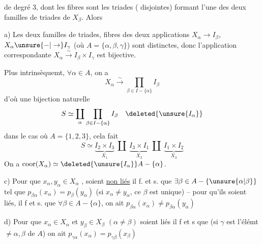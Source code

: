  de degré $3$, dont les  fibres sont les  triades ( disjointes) formant l'une des deux familles de triades de $X_\beta$. Alors

a) Les  deux familles de triades, fibres des deux applications $X_\alpha\to I_\beta$, $X_\alpha\unsure{-|\to}I_\gamma$ (où \deleted{\unsure{$\alpha$}} $A=\{\alpha,\beta,\gamma\}$) sont distinctes, donc l'application correspondante $X_\alpha\xrightarrow{\sim}I_\beta\times I_\gamma$ est bijective.

Plus intrinsèquemt, $\forall\alpha\in A$, on a
\[
 X_\alpha\xrightarrow{\sim}\prod_{\beta\in I-\{\alpha\}} I_\beta
\]
d'où une bijection naturelle
\[
 S\simeq\coprod_\alpha\prod_{\beta\in I-\{\alpha\}}I_\beta\quad\deleted{\unsure{I_{\alpha}}}
\]
dans le cas où $A=\{1,2,3\}$, cela fait
\[
 S\simeq\underbrace{I_2\times I_3}_{X_1}\ \amalg\
 \underbrace{I_3\times I_1}_{X_2}\ \amalg\
 \underbrace{I_1\times I_2}_{X_3}
\]
On a $\mathrm{coor}(X_\alpha)\simeq\deleted{\unsure{I_\alpha}}A-\{\alpha\}$.

c) Pour que  $x_\alpha,y_\alpha\in X_\alpha$ , soient \uline{non liés} il f. et s. que $\exists\beta\in A-\{\unsure{\alpha|\beta}\}$  tel que $p_{\beta\alpha}(x_\alpha)=p_\beta(y_\alpha)$ (si $x_\alpha\ne y_\alpha$, ce $\beta$ est unique) -- pour qu'ils soient liés, il f et s. que $\forall\beta\in A-\{\alpha\}$, on ait $p_{\beta\alpha}(x_\alpha)\ne p_{\beta\alpha}(y_\alpha)$

d) Pour que $x_\alpha\in X_\alpha$ et $y_\beta\in X_\beta$ $(\alpha\ne\beta)$ soient liés il f et s que (si $\gamma$ \deleted{tel que} est l'élémt $\ne\alpha,\beta$ de $A$) on ait $p_{\gamma\alpha}(x_\alpha)=p_{\gamma\beta}(x_\beta)$

